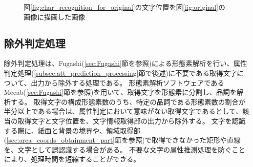 \begin{figure}[t]
    \begin{center}
        \caption{図\ref{fig:char_recognition_for_original}の文字位置を図\ref{fig:original}の画像に描画した画像}
        \label{fig:bbox_recognition_for_original}
    \end{center}
\end{figure}

\subsection{除外判定処理}\label{subsec:exclusion_judgement_processing}
除外判定処理は、Fugashi(\ref{sec:Fugashi}節を参照)による形態素解析を行い、属性判定処理(\ref{subsec:att_prediction_processing}節で後述)に不要である取得文字について、出力から除外する処理である。
形態素解析ソフトウェアであるMecab(\ref{sec:Fugashi}節を参照)を用いて、取得文字を形態素に分割し、品詞を解析する。
取得文字の構成形態素数のうち、特定の品詞である形態素数の割合が半分以上である場合は、属性判定において意味がない取得文字であるとして、該当の取得文字と文字位置を、文字情報取得部の出力から除外する。
文字を認識する際に、紙面と背景の境界や、領域取得部(\ref{sec:area_coords_obtainment_part}節を参照)で取得できなかった矩形や直線を、文字として誤認識する場合がある。
不要な文字の属性推測処理を防ぐことにより、処理時間を短縮することができる。

